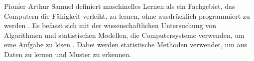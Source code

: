 \documentclass[german,bachelor]{swsLeipzig}
\begin{document}
Pionier Arthur Samuel definiert maschinelles Lernen als ein Fachgebiet, das Computern die Fähigkeit verleiht, zu lernen,
ohne ausdrücklich programmiert zu werden \cite[]{mahesh2020machine}.
Es befasst sich mit der wissenschaftlichen Untersuchung von Algorithmen und statistischen Modellen,
die Computersysteme verwenden, um eine Aufgabe zu lösen \cite[]{mahesh2020machine}.
Dabei werden statistische Methoden verwendet, um aus Daten zu lernen und Muster zu erkennen. \\






\end{document}

